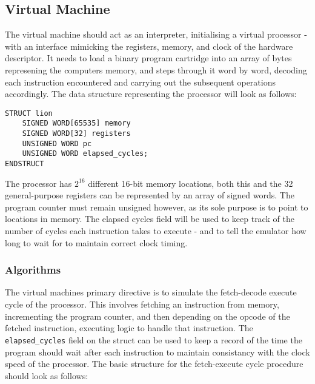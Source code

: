 \subsection{Virtual Machine}
The virtual machine should act as an interpreter, initialising a virtual processor - with an interface mimicking the registers, memory, and clock of the hardware descriptor. It needs to load a binary program cartridge into an array of bytes represening the computers memory, and steps through it word by word, decoding each instruction encountered and carrying out the subsequent operations accordingly. The data structure representing the processor will look as follows:

\begin{lstlisting}
STRUCT lion
    SIGNED WORD[65535] memory
    SIGNED WORD[32] registers
    UNSIGNED WORD pc
    UNSIGNED WORD elapsed_cycles;
ENDSTRUCT
\end{lstlisting}

The processor has $2^{16}$ different 16-bit memory locations, both this and the 32 general-purpose registers can be  represented by an array of signed words. The program counter must remain unsigned however, as its sole purpose is to point to locations in memory. The elapsed cycles field will be used to keep track of the number of cycles each instruction takes to execute - and to tell the emulator how long to wait for to maintain correct clock timing.

\subsubsection{Algorithms}

The virtual machines primary directive is to simulate the fetch-decode execute cycle of the processor. This involves fetching an instruction from memory, incrementing the program counter, and then depending on the opcode of the fetched instruction, executing logic to handle that instruction. The \texttt{elapsed\_cycles} field on the struct can be used to keep a record of the time the program should wait after each instruction to maintain consistancy with the clock speed of the processor. The basic structure for the fetch-execute cycle procedure should look as follows:

